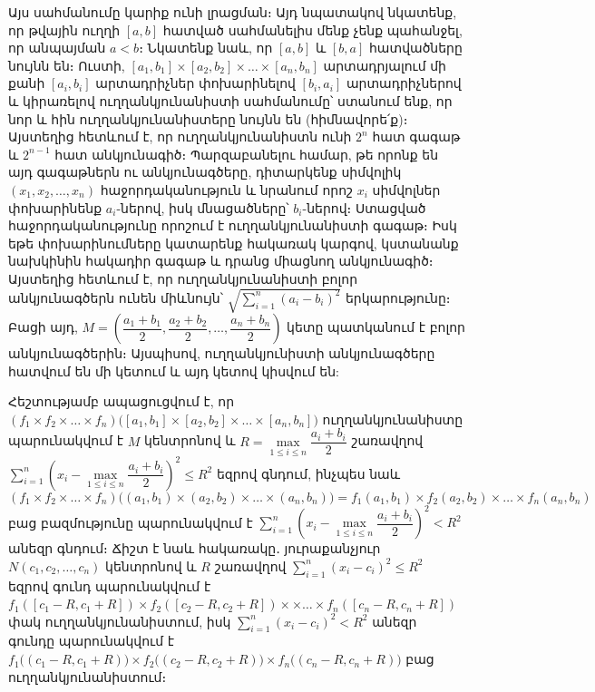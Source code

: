 \documentclass[./main.tex]{subfiles}
\begin{document}
\par Այս սահմանումը կարիք ունի լրացման։ Այդ նպատակով նկատենք, որ թվային ուղղի $[a,b]$ հատված սահմանելիս մենք չենք պահանջել, որ անպայման $a<b$։ Նկա\-տենք նաև, որ $[a,b]$ և $[b,a]$ հատվածները նույնն են։ Ուստի, $[a_1,b_1 ]\times [a_2,b_2 ]\times \dots\times [a_n,b_n]$ արտադրյալում մի քանի $[a_i,b_i]$ արտադրիչներ փոխարինելով $[b_i,a_i]$ արտադրիչներով և կիրառելով ուղղանկյունանիստի սահմանումը՝ ստանում ենք, որ նոր և հին ուղղանկյունանիստերը նույնն են (հիմնավորե՛ք)։ Այստեղից հետևում է, որ ուղղանկյունանիստն ունի $2^n$ հատ գագաթ և $2^{n-1}$ հատ անկյունագիծ։ Պարզաբա\-նելու համար, թե որոնք են այդ գագաթներն ու անկյունագծերը, դի\-տար\-կենք սիմվո\-լիկ $(x_1,x_2,\dots,x_n)$ հաջորդականություն և նրանում որոշ $x_i$ սիմվոլներ փոխարի\-նենք $a_i$-ներով, իսկ մնացածները՝ $b_i$-ներով։ Ստացված հաջորդականությունը որո\-շում է ուղ\-ղանկյունանիստի գագաթ։ Իսկ եթե փոխարինումները կատարենք հակա\-ռակ կար\-գով, կստանանք նախկինին հակադիր գագաթ և դրանց միացնող անկյունա\-գիծ։ Այստեղից հետևում է, որ ուղղանկյունանիստի բոլոր անկյունագծերն ունեն միև\-նույն՝ $\sqrt{\sum\limits_{i=1}^{n}(a_i-b_i)^2}$ երկարությունը։ Բացի այդ, $M=\left(\dfrac{a_1+b_1}{2},\dfrac{a_2+b_2}{2},\dots,\dfrac{a_n+b_n}{2}\right)$ կետը պատկանում է բոլոր անկյունագծերին։ Այսպիսով, ուղղանկյունիստի անկ\-յու\-նագծերը հատվում են մի կետում և այդ կետով կիսվում են:
\par Հեշտությամբ ապացուցվում է, որ $(f_1\times f_2\times \dots\times f_n)\big([a_1,b_1 ]\times [a_2,b_2 ]\times \dots \times [a_n,b_n ]\big)$ ուղղանկյունանիստը պարունակվում է $M$ կենտրոնով և $R=\max\limits_{1\leq i\leq n}\dfrac{a_i+b_i}{2}$ շառավղով $\sum\limits_{i=1}^{n}\left(x_i-\max\limits_{1\leq i\leq n} \dfrac{a_i+b_i}{2}\right)^2\leq R^2$  եզրով գնդում, ինչպես նաև
\[(f_1\times f_2\times \dots\times f_n)\big((a_1,b_1)\times (a_2,b_2)\times \dots\times (a_n,b_n)\big)=f_1 (a_1,b_1)\times f_2 (a_2,b_2)\times \dots\times f_n (a_n,b_n)\] 
բաց բազմությունը պարունակվում է $\sum\limits_{i=1}^{n}\left(x_i-\max\limits_{1\leq i\leq n} \dfrac{a_i+b_i}{2}\right)^2<R^2$  անեզր գնդում։ Ճիշտ է նաև հակառակը․ յուրաքանչյուր $N(c_1,c_2,\dots,c_n)$ կենտրոնով և $R$ շառավղով $\sum\limits_{i=1}^{n}(x_i-c_i)^2\leq R^2$ եզրով գունդ պարունակվում է $f_1 ([c_1-R,c_1+R])\times f_2 {([c_2-R,c_2+R])}\times \times \dots \times f_n([c_n-R,c_n+R])$ փակ ուղղանկյունանիստում, իսկ $\sum\limits_{i=1}^{n}(x_i-c_i)^2<R^2$ անեզր գունդը պարունակվում է $f_1\big((c_1-R,c_1+R)\big)\times f_2 \big((c_2-R,c_2+R)\big)\times f_n \big((c_n-R,c_n+R)\big)$ բաց ուղղանկյունանիստում։
\end{document}
